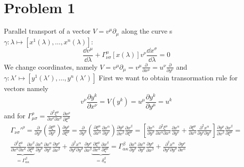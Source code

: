 
\section*{Problem 1}

Parallel transport of a vector $V=v^\mu\partial_\mu$ along the curve s
$\gamma:\lambda\mapsto\left[x^1(\lambda),\dots,x^n(\lambda)\right]$:
%
\begin{equation}
    \frac{\dd v^\mu}{\dd\lambda} +
    \Gamma_{\nu\sigma}^{\mu}\left[x(\lambda)\right]v^\nu\frac{\dd x^\sigma}{\dd \lambda}=0
\end{equation}
%
We change coordinates, namely $V = v^\mu\partial_\mu
    = v^\mu\frac{\partial}{\partial x^\mu}=u^\nu\frac{\partial}{\partial y^\nu}$ and
$\gamma:\lambda'\mapsto\left[y^1(\lambda'),\dots,y^n(\lambda')\right]$
%
First we want to obtain transormation rule for vectors namely
%
\begin{equation}
    v^\nu\frac{\partial y^k}{\partial x^\nu}
    = V(y^k) =
    u^\mu\frac{\partial y^k}{\partial y^\mu} = u^k
\end{equation}
%
and for $\Gamma_{\mu\sigma}^\rho=\frac{\partial^2 \xi^\mu}{\partial x^\nu \partial x^\sigma}
    \frac{\partial x^\rho}{\partial\xi^\mu}$
%
\begin{multline}
    \Gamma_{\nu\sigma}'^\rho =
    \frac{\partial}{\partial y^\sigma}
    \left(\frac{\partial \xi^\mu}{\partial y^\nu}\right)
    \frac{\partial y^\rho}{\partial\xi^\mu}=
    \frac{\partial}{\partial y^\sigma}
    \left(\frac{\partial \xi^\mu}{\partial x^\alpha}\frac{\partial x^\alpha}{\partial y^\nu}\right)
    \frac{\partial y^\rho}{\partial x^\beta}\frac{\partial x^\beta}{\partial\xi^\mu}=
    \left[\frac{\partial x^\kappa}{\partial y^\sigma}
        \frac{\partial^2 \xi^\mu}{\partial x^\alpha \partial x^\kappa}\frac{\partial x^\alpha}{\partial y^\nu} +
        \frac{\partial \xi^\mu}{\partial x^\alpha}\frac{\partial^2 x^\alpha}{\partial y^\nu \partial y^\sigma}\right]
    \frac{\partial y^\rho}{\partial x^\beta}\frac{\partial x^\beta}{\partial\xi^\mu}= \\
    \underbrace{\frac{\partial^2 \xi^\mu}{\partial x^\alpha \partial x^\kappa}
        \frac{\partial x^\beta}{\partial\xi^\mu} }_{=\Gamma_{\alpha\kappa}^\beta}
    \frac{\partial x^\kappa}{\partial y^\sigma}
    \frac{\partial x^\alpha}{\partial y^\nu}
    \frac{\partial y^\rho}{\partial x^\beta}
    +
    \frac{\partial^2 x^\alpha}{\partial y^\nu \partial y^\sigma}
    \frac{\partial y^\rho}{\partial x^\beta}
    \underbrace{\frac{\partial \xi^\mu}{\partial x^\alpha}
        \frac{\partial x^\beta}{\partial\xi^\mu}}_{=\delta_\alpha^\beta}=
    \Gamma_{\alpha\kappa}^\beta
    \frac{\partial x^\kappa}{\partial y^\sigma}
    \frac{\partial x^\alpha}{\partial y^\nu}
    \frac{\partial y^\rho}{\partial x^\beta}
    +
    \frac{\partial^2 x^\alpha}{\partial y^\nu \partial y^\sigma}
    \frac{\partial y^\rho}{\partial x^\alpha}
\end{multline}

